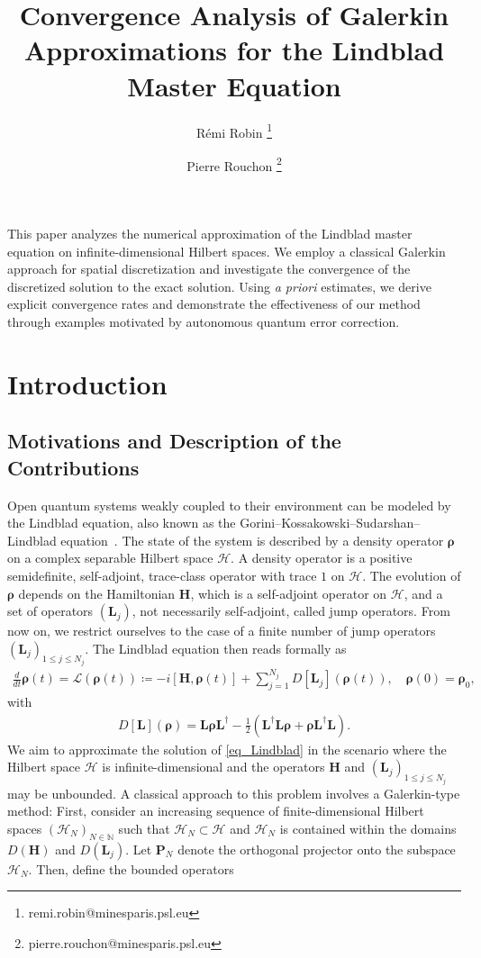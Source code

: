 \documentclass{article}
\title{Convergence Analysis of Galerkin Approximations for the Lindblad Master Equation}
\author[1]{Rémi Robin 	\thanks{remi.robin@minesparis.psl.eu}}
\author[1]{Pierre Rouchon 	\thanks{pierre.rouchon@minesparis.psl.eu}}
\affil[1]{Laboratoire de Physique de l'\'Ecole Normale Supérieure, Mines Paris, Inria, CNRS, ENS-PSL, Sorbonne Université, PSL Research University, Paris, France}
\newcommand{\xL}{\mathcal{L}}
\newcommand{\xH}{\mathcal{H}}
\let\bf\boldsymbol
\newcommand{\orho}{{\bf \rho}}
\newcommand{\oL}{{\bf L}}
\newcommand{\oH}{{\bf H}}
\newcommand{\oP}{{\bf P}}
\newcommand{\Ndissip}{N_j}
\begin{document}
\maketitle
This paper analyzes the numerical approximation of the Lindblad master equation on infinite-dimensional Hilbert spaces. We employ a classical Galerkin approach for spatial discretization and investigate the convergence of the discretized solution to the exact solution. Using \textit{a priori} estimates, we derive explicit convergence rates and demonstrate the effectiveness of our method through examples motivated by autonomous quantum error correction.
\tableofcontents
\section{Introduction}
\subsection{Motivations and Description of the Contributions}
Open quantum systems weakly coupled to their environment can be modeled by the Lindblad equation, also known as the Gorini--Kossakowski--Sudarshan--Lindblad equation~\cite{lindbladGeneratorsQuantumDynamical1976,goriniCompletelyPositiveDynamical1976,chruscinskiBriefHistoryGKLS2017}. The state of the system is described by a density operator $\orho$ on a complex separable Hilbert space $\xH$. A density operator is a positive semidefinite, self-adjoint, trace-class operator with trace $1$ on $\mathcal{H}$. The evolution of $\orho$ depends on the Hamiltonian $\oH$, which is a self-adjoint operator on $\xH$, and a set of operators $(\oL_j)$, not necessarily self-adjoint, called jump operators. From now on, we restrict ourselves to the case of a finite number of jump operators $(\oL_j)_{1\leq j\leq \Ndissip}$. The Lindblad equation then reads formally as 
\begin{align}
    \label{eq_Lindblad}
    \frac{d}{dt}\orho(t) =\xL(\orho(t)) \coloneq -i[\oH,\orho(t)] + \sum_{j=1}^{\Ndissip} D[\oL_j](\orho(t)),\quad \orho(0)=\orho_0,
\end{align}
with
\begin{align}
    \label{eq_dissipative}
    D[\oL](\orho)=\oL\orho \oL^\dag -\frac{1}{2}( \oL^\dag \oL \orho + \orho \oL^\dag \oL).
\end{align}
We aim to approximate the solution of \cref{eq_Lindblad} in the scenario where the Hilbert space $\mathcal{H}$ is infinite-dimensional and the operators $\oH$ and $(\oL_j)_{1 \leq j \leq \Ndissip}$ may be unbounded. A classical approach to this problem involves a Galerkin-type method: First, consider an increasing sequence of finite-dimensional Hilbert spaces $(\mathcal{H}_N)_{N \in \mathbb{N}}$ such that $\mathcal{H}_N \subset \mathcal{H}$ and $\mathcal{H}_N$ is contained within the domains $D(\oH)$ and $D(\oL_j)$. Let $\oP_N$ denote the orthogonal projector onto the subspace $\mathcal{H}_N$. Then, define the bounded operators
\end{document}
